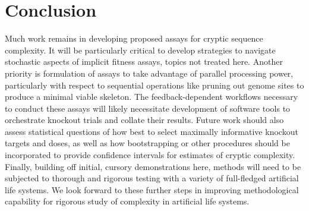 \section{Conclusion} \label{sec:conclusion}

Much work remains in developing proposed assays for cryptic sequence complexity.
It will be particularly critical to develop strategies to navigate stochastic aspects of implicit fitness assays, topics not treated here.
Another priority is formulation of assays to take advantage of parallel processing power, particularly with respect to sequential operations like pruning out genome sites to produce a minimal viable skeleton.
The feedback-dependent workflows necessary to conduct these assays will likely necessitate development of software tools to orchestrate knockout trials and collate their results.
Future work should also assess statistical questions of how best to select maximally informative knockout targets and doses, as well as how bootstrapping or other procedures should be incorporated to provide confidence intervals for estimates of cryptic complexity.
Finally, building off initial, cursory demonstrations here, methods will need to be subjected to thorough and rigorous testing with a variety of full-fledged artificial life systems.
We look forward to these further steps in improving methodological capability for rigorous study of complexity in artificial life systems.



